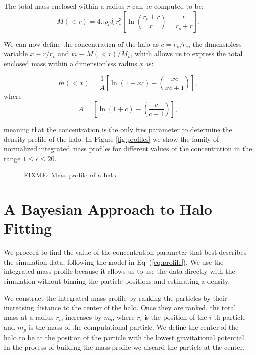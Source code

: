 \documentclass[useAMS,usenatbib]{mn2e}
\begin{document}
The total mass enclosed within a radius $r$ can be computed to be:
\begin{equation}
M(<r) = 4\pi\rho_c\delta_c  r_s^3\left[\ln \left
  (\frac{r_s+r}{r}\right) - \frac{r}{r_s+r}\right].
\end{equation}
 
We can now define the concentration of the halo as $c=r_v/r_s$, the
dimensioless variable $x\equiv r/r_v$ and $m\equiv M(<r)/M_v$, which
allows us to express the total enclosed mass within a dimensionless
radius $x$ as:


\begin{equation}
m(<x) =
\frac{1}{A}\left[\ln\left(1+xc\right)-\left(\frac{xc}{xc+1}\right)\right],
\label{eq:profile}
\end{equation}
%
where 
%
\begin{equation}
A=\left[\ln\left(1+c\right)-\left(\frac{c}{c+1}\right)\right],
\end{equation}

meaning that the concentration is the only free parameter to
determine the density profile of the halo. In Figure
\ref{fig:profiles} we show the family of normalized integrated mass
profiles for different values of the concentration in the range
$1\leq c \leq 20$. 


\begin{figure}
\caption{FIXME: Mass profile of a halo}
\end{figure}


\section{A Bayesian Approach to Halo Fitting}
\label{sec:method}


We proceed to find the value of the concentration parameter that
best describes the simulation data, following the model in
Eq. (\ref{eq:profile}). We use the integrated mass profile because it
allows us to use the data directly with the simulation without binning
the particle positions and estimating a density.

We construct the integrated mass profile by ranking the particles by
their increasing distance to the center of the halo. Once they are ranked,
the total mass at a radius $r_i$, increases by $m_p$, where $r_i$ is
the position of the $i$-th particle and $m_p$ is the mass of the
computational particle.  We define the center of the halo to be  at
the position of the particle with the lowest gravitational
potential. In the process of building the mass profile we discard the
particle at the center.
\end{document}
